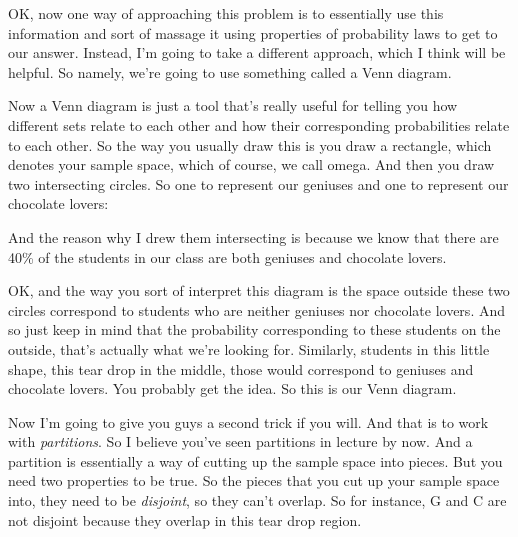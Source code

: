 \documentclass[pdftex, brazil, 12pt, twoside]{article}
\begin{document}
OK, now one way of approaching this problem is to essentially
use this information and sort of massage it using properties
of probability laws to get to our answer.
Instead, I'm going to take a different approach, which I
think will be helpful.
So namely, we're going to use something
called a Venn diagram.

Now a Venn diagram is just a tool that's really useful for
telling you how different sets relate to each other and how
their corresponding probabilities
relate to each other.
So the way you usually draw this is you draw a rectangle,
which denotes your sample space, which of course, we
call omega.
And then you draw two intersecting circles.
So one to represent our geniuses and one to represent
our chocolate lovers:

\begin{figure}[H]
  \begin{center}
  \end{center}
\end{figure}

And the reason why I drew them intersecting is because we
know that there are 40\% of the students in our class are both
geniuses and chocolate lovers.

OK, and the way you sort of interpret this diagram is the
space outside these two circles correspond to students
who are neither geniuses nor chocolate lovers.
And so just keep in mind that the probability corresponding
to these students on the outside, that's actually what
we're looking for.
Similarly, students in this little shape, this tear drop
in the middle, those would correspond to geniuses and
chocolate lovers.
You probably get the idea.
So this is our Venn diagram.

Now I'm going to give you guys a second trick if you will.
And that is to work with \emph{partitions}.
So I believe you've seen partitions in lecture by now.
And a partition is essentially a way of cutting up the sample
space into pieces.
But you need two properties to be true.
So the pieces that you cut up your sample space into, they
need to be \emph{disjoint}, so they can't overlap.
So for instance, G and C are not disjoint because they
overlap in this tear drop region.
\end{document}
